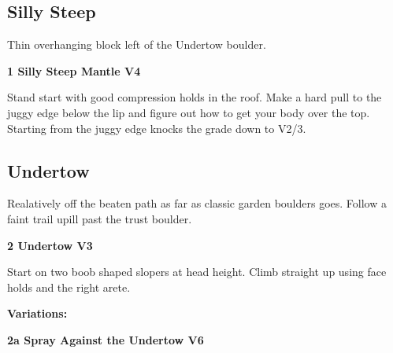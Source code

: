 \begin{multicols}{2}
\begin{minipage}{\columnwidth}
			\subsection*{Silly Steep}\label{bf:Silly Steep}
			Thin overhanging block left of the Undertow boulder.
			
			\end{minipage}
			
					\begin{minipage}{\linewidth}	
					\label{rt:Silly Steep Mantle}
\colorbox{RoyalBlue!20}{
\parbox{0.95\textwidth}{
\textbf{
1 Silly Steep Mantle V4    
}
}
}

					\begin{adjustwidth}{0.5cm}{}				
					Stand start with good compression holds in the roof. Make a hard pull to the juggy edge below the lip and figure out how to get your body over the top. Starting from the juggy edge knocks the grade down to V2/3.
					\end{adjustwidth}
					\end{minipage}

			\begin{minipage}{\columnwidth}
			\subsection*{Undertow}\label{bf:Undertow}
			Realatively off the beaten path as far as classic garden boulders goes. Follow a faint trail upill past the trust boulder.
			
\label{pt:Riptide}
			\end{minipage}
			

					\begin{minipage}{\linewidth}	
					\label{rt:Undertow}
\colorbox{green!20}{
\parbox{0.95\textwidth}{
\textbf{
2 Undertow V3     
}
}
}

					\begin{adjustwidth}{0.5cm}{}				
					Start on two boob shaped slopers at head height. Climb straight up using face holds and the right arete.
					\end{adjustwidth}
					\end{minipage}
						\begin{adjustwidth}{0.5cm}{}				
						\textbf{Variations:} \newline
							\begin{minipage}{\linewidth}	
							\label{vr:Spray Against the Undertow}
\colorbox{RoyalBlue!20}{
\parbox{0.95\textwidth}{
\textbf{
2a Spray Against the Undertow V6  
}
}
}


\end{minipage}
\end{adjustwidth}
\end{multicols}

